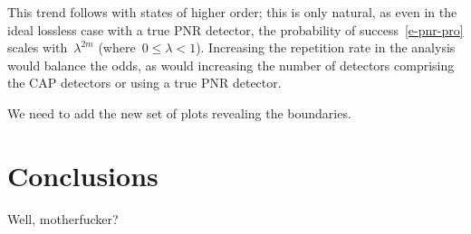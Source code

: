 \documentclass{article}
\begin{document}
This trend follows with states of higher order; this is only natural, as even in the ideal lossless case with a true PNR detector, the probability of success~\eqref{e-pnr-pro} scales with~${\lambda^{2m}}$ (where~${0 \leq \lambda < 1}$). Increasing the repetition rate in the analysis would balance the odds, as would increasing the number of detectors comprising the CAP detectors or using a true PNR detector.

We need to add the new set of plots revealing the boundaries.

%

\section{Conclusions}

Well, motherfucker?

%

\FloatBarrier
\printbibliography[heading = bibnumbered]
\end{document}
